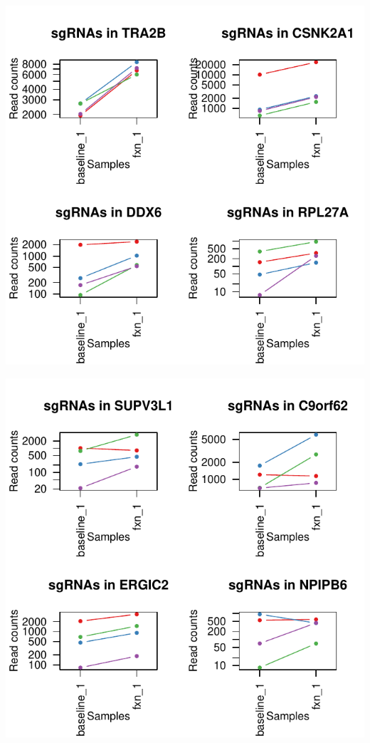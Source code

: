 \documentclass{article}
\begin{document}
\includegraphics{defaultTest_defaultNormCount_screen1_summary-010}
%


\includegraphics{defaultTest_defaultNormCount_screen1_summary-011}
%
\end{document}
